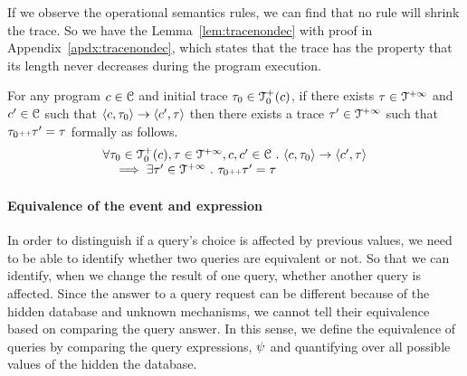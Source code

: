 If we observe the operational semantics rules, we can find that no rule will shrink the trace. 
So we have the Lemma~\ref{lem:tracenondec} with proof in Appendix~\ref{apdx:tracenondec}, 
which states that the trace has the property that its length never decreases during the program execution.
\begin{lem}
\label{lem:tracenondec}
For any program $c \in \mathcal{C}$ and initial trace $\mathtt{\tau}_0 \in \mathcal{T}^{+}_0(c)$,
if there exists $\mathtt{\tau} \in \mathcal{T}^{+\infty}$ and $c' \in \mathcal{C} $ such that $\langle c, \mathtt{\tau}_0 \rangle \rightarrow \langle c', \mathtt{\tau} \rangle $
then there exists a trace $\mathtt{\tau}' \in \mathcal{T}^{+\infty}$ such that $\mathtt{\tau}_0 {\scriptscriptstyle ++} \mathtt{\tau}' = \mathtt{\tau}$ formally as follows.
%
\[
 \begin{array}{l}
 \forall \mathtt{\tau}_0 \in \mathcal{T}^{+}_0(c), \mathtt{\tau} \in \mathcal{T}^{+\infty}, c, c' \in \mathcal{C} ~.~
 \langle c, \mathtt{\tau}_0 \rangle \rightarrow \langle c', \mathtt{\tau} \rangle 
 \\ \quad
 \implies \exists \mathtt{\tau}' \in \mathcal{T}^{+\infty} ~.~ \mathtt{\tau}_0 {\scriptscriptstyle ++} \mathtt{\tau}' = \mathtt{\tau} 
 \end{array}
\]
\end{lem}

\paragraph{Equivalence of the event and expression}

In order to distinguish if a query's choice is affected by previous values, 
we need to be able to identify whether two queries are equivalent or not. So that we can identify, when we change the result of one query, 
whether another query is affected. 
Since the answer to a query request can be different because of the hidden database and unknown mechanisms,
we cannot tell their equivalence based on comparing the query answer.
In this sense, we 
define the equivalence of queries by comparing the query expressions, $\psi$
and quantifying over all possible values of the hidden the database.

